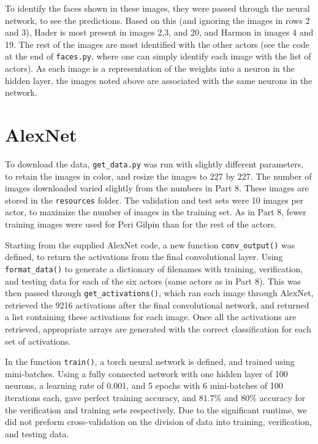 \documentclass{article}
\begin{document}
   To identify the faces shown in these images, they were passed through the neural network, to see the predictions.
   Based on this (and ignoring the images in rows 2 and 3), Hader is most present in images 2,3, and 20,
   and Harmon in images 4 and 19. The rest of the images are most identified with the other actors (see
   the code at the end of \texttt{faces.py}, where one can simply identify each image with the list of actors).
   As each image is a representation of the weights into a neuron in the hidden layer, the images noted above
   are associated with the same neurons in the network.

   \section{AlexNet}
   To download the data, \texttt{get\_data.py} was run with slightly different parameters, to retain the images
   in color, and resize the images to 227 by 227. The number of images downloaded varied slightly from the numbers
   in Part 8. These images are stored in the \texttt{resources} folder.
   The validation and test sets were 10 images per actor, to maximize the number of images in the training set.
   As in Part 8, fewer training images were used for Peri Gilpin than for the rest of the actors.

   Starting from the supplied AlexNet code, a new function \texttt{conv\_output()} was defined,
   to return the activations from the final convolutional layer. Using \texttt{format\_data()} to generate
   a dictionary of filenames with training, verification, and testing data for each of the six actors (same
   actors as in Part 8). This was then passed through \texttt{get\_activations()}, which ran each image
   through AlexNet, retrieved the 9216 activations after the final convolutional network, and returned a list
   containing these activations for each image. Once all the activations are retrieved, appropriate
   arrays are generated with the correct classification for each set of activations.

   In the function \texttt{train()}, a torch neural network is defined, and trained using mini-batches.
   Using a fully connected network with one hidden layer of 100 neurons, a learning rate of 0.001, and
   5 epochs with 6 mini-batches of 100 iterations each, gave perfect training accuracy, and $81.7\%$ and
   $80\%$ accuracy for the verification and training sets respectively.
   Due to the significant runtime, we did not preform cross-validation on the division of data into
   training, verification, and testing data.
\end{document}
